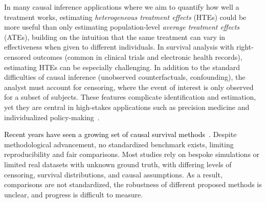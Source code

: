 \documentclass{article} %
\newcommand{\rebuttal}[1]{\textcolor{black}{#1}}
\begin{document}
In many causal inference applications where we aim to quantify how well a treatment works, estimating \emph{heterogeneous treatment effects} (HTEs) could be more useful than only estimating population‐level \emph{average treatment effects} (ATEs), building on the intuition that the same treatment can vary in effectiveness when given to different individuals. 
In survival analysis with right-censored outcomes (common in clinical trials and electronic health records), estimating HTEs can be especially challenging. In addition to the standard difficulties of causal inference (unobserved counterfactuals, confounding), the analyst must account for censoring, where the event of interest is only observed for a subset of subjects.  These features complicate identification and estimation, yet they are central in high-stakes applications such as precision medicine and individualized policy-making~\citep{zhu2020targeted, chapfuwa2021enabling, curth2021survite}.

\rebuttal{Recent years have seen a growing set of causal survival methods~\citep{chapfuwa2021enabling, curth2021survite, cui2023estimating, bo2024ameta, noroozizadeh2025impact, xu2024estimating, meir2025heterogeneous}.}
Despite methodological advancement, no standardized benchmark exists, limiting reproducibility and fair comparisons. 
Most studies rely on bespoke simulations or limited real datasets with unknown ground truth, with differing levels of censoring, survival distributions, and causal assumptions. As a result, comparisons are not standardized, the robustness of different proposed methods is unclear, and progress is difficult to measure. 
\end{document}
